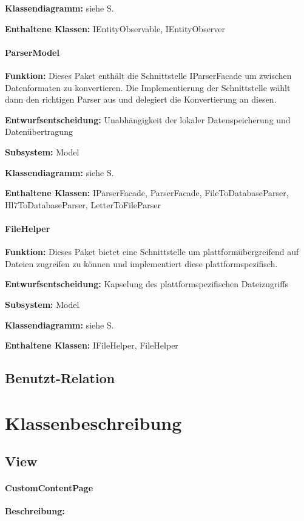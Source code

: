 \documentclass[a4paper]{scrreprt}
\begin{document}
\textbf{Klassendiagramm:} siehe S.

\textbf{Enthaltene Klassen:} IEntityObservable, IEntityObserver

\subsubsection{ParserModel}
\textbf{Funktion:} Dieses Paket enthält die Schnittstelle IParserFacade um zwischen Datenformaten zu konvertieren.
Die Implementierung der Schnittstelle wählt dann den richtigen Parser aus und delegiert die Konvertierung an diesen.

\textbf{Entwurfsentscheidung:} Unabhängigkeit der lokaler Datenspeicherung und Datenübertragung

\textbf{Subsystem:} Model

\textbf{Klassendiagramm:} siehe S.

\textbf{Enthaltene Klassen:} IParserFacade, ParserFacade, FileToDatabaseParser, Hl7ToDatabaseParser, LetterToFileParser

\subsubsection{FileHelper}
\textbf{Funktion:} Dieses Paket bietet eine Schnittstelle um plattformübergreifend auf Dateien zugreifen zu können und implementiert diese plattformspezifisch.

\textbf{Entwurfsentscheidung:} Kapselung des plattformspezifischen Dateizugriffs

\textbf{Subsystem:} Model

\textbf{Klassendiagramm:} siehe S.

\textbf{Enthaltene Klassen:} IFileHelper, FileHelper

\section{Benutzt-Relation}

\chapter{Klassenbeschreibung}
\section{View}

\subsubsection{CustomContentPage}
\textbf{Beschreibung:}
\end{document}
